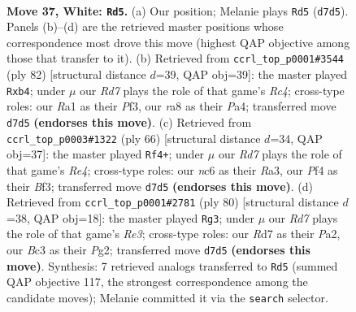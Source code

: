 \documentclass[11pt]{article}
\begin{document}
\clearpage

\begin{figure}[p]\centering
\begin{subfigure}{0.46\textwidth}\centering
\resizebox{\linewidth}{!}{%
\newchessgame
\chessboard[
  setfen={r5k1/3R3r/p1n5/8/1P3P2/2B3K1/P3b3/R7 w - - 7 37},
  showmover=false,
  pgfstyle=straightmove, color=movearrow, markmove={d7-d5}
]}
\caption{}
\end{subfigure}\hfill
\begin{subfigure}{0.46\textwidth}\centering
\resizebox{\linewidth}{!}{%
\newchessgame
\chessboard[
  setfen={8/1pr4p/3k2b1/1B6/PpR5/5P2/5K2/8 w - - 2 42},
  showmover=false,
  pgfstyle=straightmove, color=movearrow, markmove={c4-b4}
]}
\caption{}
\end{subfigure}
\\[4pt]
\begin{subfigure}{0.46\textwidth}\centering
\resizebox{\linewidth}{!}{%
\newchessgame
\chessboard[
  setfen={1r6/4r2p/5k2/1b6/p3R2P/R4B2/2P5/2K5 w - - 2 34},
  showmover=false,
  pgfstyle=straightmove, color=movearrow, markmove={e4-f4}
]}
\caption{}
\end{subfigure}\hfill
\begin{subfigure}{0.46\textwidth}\centering
\resizebox{\linewidth}{!}{%
\newchessgame
\chessboard[
  setfen={5r2/3B1k1p/1R6/2rp1P1p/8/2n1R3/P5PK/8 w - - 8 41},
  showmover=false,
  pgfstyle=straightmove, color=movearrow, markmove={e3-g3}
]}
\caption{}
\end{subfigure}
\caption{\textbf{Move 37, White: \texttt{Rd5}.} (a) Our position; Melanie plays \texttt{Rd5} (\texttt{d7d5}). Panels (b)--(d) are the retrieved master positions whose correspondence most drove this move (highest QAP objective among those that transfer to it). (b) Retrieved from \texttt{ccrl\_top\_p0001\#3544} (ply 82) [structural distance $d$=39, QAP obj=39]: the master played \texttt{Rxb4}; under $\mu$ our \emph{Rd7} plays the role of that game's \emph{Rc4}; cross-type roles: our \emph{R}a1 as their \emph{P}f3, our \emph{r}a8 as their \emph{P}a4; transferred move \texttt{d7d5} \textbf{(endorses this move)}. (c) Retrieved from \texttt{ccrl\_top\_p0003\#1322} (ply 66) [structural distance $d$=34, QAP obj=37]: the master played \texttt{Rf4+}; under $\mu$ our \emph{Rd7} plays the role of that game's \emph{Re4}; cross-type roles: our \emph{n}c6 as their \emph{R}a3, our \emph{P}f4 as their \emph{B}f3; transferred move \texttt{d7d5} \textbf{(endorses this move)}. (d) Retrieved from \texttt{ccrl\_top\_p0001\#2781} (ply 80) [structural distance $d$=38, QAP obj=18]: the master played \texttt{Rg3}; under $\mu$ our \emph{Rd7} plays the role of that game's \emph{Re3}; cross-type roles: our \emph{R}d7 as their \emph{P}a2, our \emph{B}c3 as their \emph{P}g2; transferred move \texttt{d7d5} \textbf{(endorses this move)}. Synthesis: 7 retrieved analogs transferred to \texttt{Rd5} (summed QAP objective 117, the strongest correspondence among the candidate moves); Melanie committed it via the \texttt{search} selector.}
\label{fig:thought-m72}
\end{figure}
\end{document}
